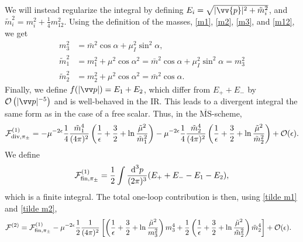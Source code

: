 We will instead regularize the integral by defining $E_i = \sqrt{|\vv{p}|^2 + \tilde m_i^2}$, and $\tilde m_i^2 = m_i^2 + \frac{1}{4} m_{12}^2$.
Using the definition of the masses, \autoref{m1}, \autoref{m2}, \autoref{m3}, and \autoref{m12}, we get
%
\begin{align}
    m_3^2 & = \bar m^2 \cos \alpha + \mu_ I^2 \sin^2 \alpha, \\
    \label{tilde m1}
    \tilde m_1^2 
    & 
    = m_1^2 + \mu^2 \cos\alpha^2
    = \bar m^2 \cos \alpha + \mu_I^2 \sin^2 \alpha
    = m_3^2 \\
    \label{tilde m2}
    \tilde m_2^2 
    & = m_2^2 + \mu^2 \cos\alpha^2
    = \bar m^2 \cos \alpha.
\end{align}
%
Finally, we define $f(|\vv p|) = E_1 + E_2$, which differ from $E_+ + E_-$ by $\Oh\left(|\vv p|^{-5}\right)$ and is well-behaved in the IR.
This leads to a divergent integral the same form as in the case of a free scalar.
Thus, in the $\mathrm{\overline{MS}}$-scheme, 
%
\begin{equation}
    \mathcal{F}^{(1)}_{\mathrm{div}, \pi_\pm }
    =
    - \mu^{-2 \epsilon} \frac{1}{4} \frac{\tilde m_1^4}{(4\pi)^2} 
    \left(
        \frac{1}{\epsilon} + \frac{3}{2} + \ln \frac{\tilde \mu^2}{\tilde m_1^2}
    \right) 
    -  \mu^{-2 \epsilon} \frac{1}{4} \frac{\tilde m_2^4}{(4\pi)^2} 
    \left(
        \frac{1}{\epsilon} + \frac{3}{2} + \ln \frac{\tilde \mu^2}{\tilde m_2^2}
    \right) 
    + \mathcal{O}(\epsilon).
\end{equation}
%
We define
%
\begin{equation}
    \mathcal{F}^{(1)}_{\mathrm{fin}, \pi_\pm}
    = 
    \frac{1}{2} \int \frac{\text{d}^3 p}{(2\pi)^3} (E_+ + E_- - E_1 - E_2),
\end{equation}
%
which is a finite integral.
The total one-loop contribution is then, using \autoref{tilde m1} and \autoref{tilde m2},
%
\begin{align}
    \mathcal{F}^{(2)}
    & = 
    \mathcal{F}^{(1)}_{\mathrm{fin}, \pi_\pm}
    - \mu^{-2 \epsilon} \frac{1}{2}\frac{1}{(4\pi)^2}
    \left[
        \left( \frac{1}{\epsilon} + \frac{3}{2} + \ln \frac{\tilde \mu^2}{m_3^2 } \right)
        m_3^4
        +
        \frac{1}{2}
        \left( \frac{1}{\epsilon} + \frac{3}{2} + \ln \frac{\tilde \mu^2}{\tilde m_2^2} \right)
        \tilde m_2^4
    \right]
    + \mathcal O(\epsilon).
\end{align}

